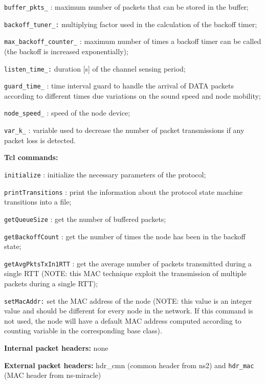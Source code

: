 \begin{description}
\begin{description}
     \item {\tt buffer\_pkts\_} : maximum number of packets that can be stored in the buffer;
     \item {\tt backoff\_tuner\_:} multiplying factor used in the calculation of the backoff timer;   
     \item {\tt max\_backoff\_counter\_} : maximum number of times a backoff timer can be called (the backoff is increased exponentially);
     \item {\tt listen\_time\_:} duration [s] of the channel sensing period;
     \item {\tt guard\_time\_} : time interval guard to handle the arrival of DATA packets according to different times due variations on the sound speed and node mobility;
     \item {\tt node\_speed\_} : speed of the node device;
     \item {\tt var\_k\_} : variable used to decrease the number of packet transmissions if any packet loss is detected.
    \end{description}
   \item {\bf Tcl commands:}
    \begin{description}
     \item {\tt initialize} : initialize the necessary parameters of the protocol; 
     \item {\tt printTransitions} : print the information about the protocol state machine transitions into a file;	
     \item {\tt getQueueSize} : get the number of buffered packets; 
     \item {\tt getBackoffCount} : get the number of times the node has been in the backoff state;
     \item {\tt getAvgPktsTxIn1RTT} : get the average number of packets transmitted during a single RTT (NOTE: this MAC technique exploit the transmission of multiple packets during a single RTT);
     \item {\tt setMacAddr:} set the MAC address of the node (NOTE: this value is an integer value and should be different for every node in the network. If this command is not used, the node will have a default MAC address computed according to counting variable in the corresponding base class).
    \end{description}
   \item {\bf Internal packet headers:} none
   \item {\bf External packet headers:} {hdr\_cmn} (common header from ns2) and {\tt hdr\_mac} (MAC header from ns-miracle)

\end{description}
